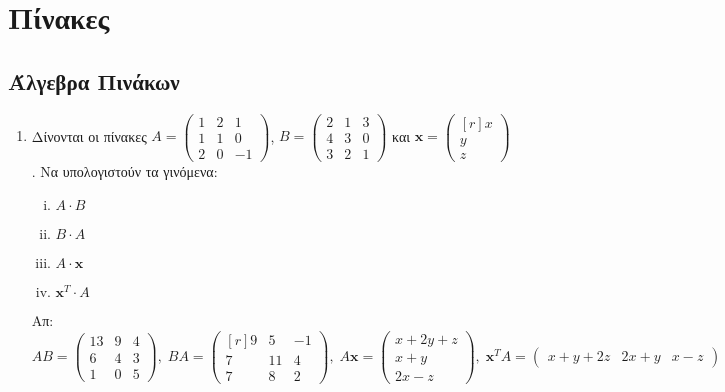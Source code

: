 



\geometry{top=2cm}

\pagestyle{askhseis}



\chapter*{Πίνακες}

\section*{Άλγεβρα Πινάκων}

\begin{enumerate}
  \item Δίνονται οι πίνακες $ A = 
    \begin{pmatrix}
      1 & 2 & 1 \\
      1 & 1 & 0 \\
      2 & 0 & -1
    \end{pmatrix} $, $ B= 
    \begin{pmatrix}
      2 & 1 & 3 \\
      4 & 3 & 0 \\
      3 & 2 & 1
    \end{pmatrix} $ και $ \mathbf{x} =  
    \begin{pmatrix*}[r] x \\ y \\ z \end{pmatrix*} $. Να υπολογιστούν τα γινόμενα:
    \begin{enumerate}[i)]
      \item $ A\cdot B $
      \item $ B\cdot A $
      \item $A \cdot \mathbf{x} $
      \item $ \mathbf{x}^{T} \cdot A$
    \end{enumerate} 
    \hfill Απ: $ \scriptstyle{AB= 
    \begin{pmatrix}
      13 & 9 & 4 \\
      6 & 4 & 3 \\
      1 & 0 & 5
    \end{pmatrix}, \;  BA = 
    \begin{pmatrix*}[r]
      9 & 5 & -1 \\
      7 & 11 & 4 \\
      7 & 8 & 2
    \end{pmatrix*}, \; A \mathbf{x} = 
    \begin{pmatrix*} x+2y+z \\ x+y \\ 2x-z \end{pmatrix*}, \;  \mathbf{x}^{T}A = 
    \begin{pmatrix*}
      x+y+2z & 2x+y & x-z
  \end{pmatrix*}} $  


\end{enumerate}
